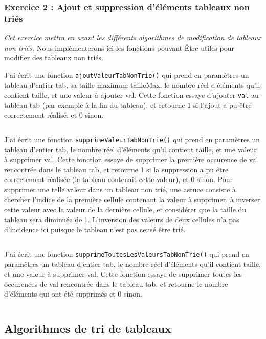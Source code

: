 \subsubsection{Exercice 2 : Ajout et suppression d'éléments tableaux non triés}
\textit{Cet exercice mettra en avant les différents algorithmes de modification de tableaux non triés.}
Nous implémenterons ici les fonctions pouvant Être utiles pour modifier des tableaux non triés.

J'ai écrit une fonction \texttt{ajoutValeurTabNonTrie()} qui prend en paramètres un tableau d’entier tab, sa taille maximum tailleMax, le nombre réel d’éléments qu’il contient taille, et une valeur à ajouter val. Cette fonction essaye d’ajouter \texttt{val} au tableau tab (par exemple à la fin du tableau), et retourne 1 si l’ajout a pu être correctement réalisé, et 0 sinon.
\inputminted[linenos,firstline=7, lastline=13]{cpp}{../sources/cpp/TP1-2/modifTableauxNonTries.c}

J'ai écrit une fonction \texttt{supprimeValeurTabNonTrie()} qui prend en paramètres un tableau d’entier tab, le nombre réel d’éléments qu’il contient taille, et une valeur à supprimer val. Cette fonction essaye de supprimer la première occurence de val rencontrée dans le tableau tab, et retourne 1 si la suppression a pu être correctement réalisée (le tableau contenait cette valeur), et 0 sinon. Pour supprimer une telle valeur dans un tableau non trié, une astuce consiste à chercher l’indice de la première cellule contenant la valeur à supprimer, à inverser cette valeur avec la valeur de la dernière cellule, et considérer que la taille du tableau sera diminuée de 1. L’inversion des valeurs de deux cellules n’a pas d’incidence ici puisque le tableau n’est pas censé être trié.
\inputminted[linenos,firstline=15, lastline=27]{cpp}{../sources/cpp/TP1-2/modifTableauxNonTries.c}

J'ai écrit une fonction \texttt{supprimeToutesLesValeursTabNonTrie()} qui prend en paramètres un tableau d’entier tab, le nombre réel d’éléments qu’il contient taille, et une valeur à supprimer val. Cette fonction essaye de supprimer toutes les occurences de val rencontrée dans le tableau tab, et retourne le nombre d’éléments qui ont été supprimés et 0 sinon.
\inputminted[linenos,firstline=29, lastline=35]{cpp}{../sources/cpp/TP1-2/modifTableauxNonTries.c}

\subsection{Algorithmes de tri de tableaux}
